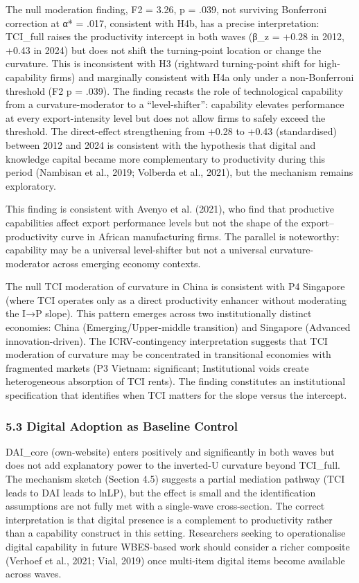 \documentclass[12pt,a4paper]{article}
\begin{document}
The null moderation finding, F2 = 3.26, p = .039, not surviving
Bonferroni correction at α* = .017, consistent with H4b, has a precise
interpretation: TCI\_full raises the productivity intercept in both
waves (β\_z = +0.28 in 2012, +0.43 in 2024) but does not shift the
turning-point location or change the curvature. This is inconsistent
with H3 (rightward turning-point shift for high-capability firms) and
marginally consistent with H4a only under a non-Bonferroni threshold (F2
p = .039). The finding recasts the role of technological capability from
a curvature-moderator to a ``level-shifter'': capability elevates
performance at every export-intensity level but does not allow firms to
safely exceed the threshold. The direct-effect strengthening from +0.28
to +0.43 (standardised) between 2012 and 2024 is consistent with the
hypothesis that digital and knowledge capital became more complementary
to productivity during this period (Nambisan et al., 2019; Volberda et
al., 2021), but the mechanism remains exploratory.

This finding is consistent with Avenyo et al. (2021), who find that
productive capabilities affect export performance levels but not the
shape of the export--productivity curve in African manufacturing firms.
The parallel is noteworthy: capability may be a universal level-shifter
but not a universal curvature-moderator across emerging economy
contexts.

The null TCI moderation of curvature in China is consistent with P4
Singapore (where TCI operates only as a direct productivity enhancer
without moderating the I→P slope). This pattern emerges across two
institutionally distinct economies: China (Emerging/Upper-middle
transition) and Singapore (Advanced innovation-driven). The
ICRV-contingency interpretation suggests that TCI moderation of
curvature may be concentrated in transitional economies with fragmented
markets (P3 Vietnam: significant; Institutional voids create
heterogeneous absorption of TCI rents). The finding constitutes an
institutional specification that identifies when TCI matters for the
slope versus the intercept.

\hypertarget{53-digital-adoption-as-baseline-control}{%
\subsubsection{5.3 Digital Adoption as Baseline
Control}\label{53-digital-adoption-as-baseline-control}}

DAI\_core (own-website) enters positively and significantly in both
waves but does not add explanatory power to the inverted-U curvature
beyond TCI\_full. The mechanism sketch (Section 4.5) suggests a partial
mediation pathway (TCI leads to DAI leads to lnLP), but the effect is
small and the identification assumptions are not fully met with a
single-wave cross-section. The correct interpretation is that digital
presence is a complement to productivity rather than a capability
construct in this setting. Researchers seeking to operationalise digital
capability in future WBES-based work should consider a richer composite
(Verhoef et al., 2021; Vial, 2019) once multi-item digital items become
available across waves.
\end{document}
